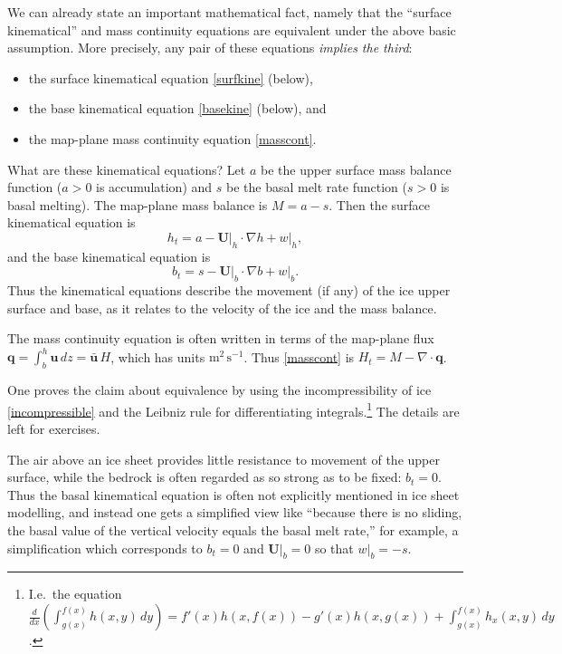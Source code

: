 \documentclass[titlepage,letterpaper,final,12pt]{scrartcl}
\newcommand{\bq}{\mathbf{q}}
\newcommand{\grad}{\nabla}
\newcommand{\Div}{\nabla\cdot}
\begin{document}
We can already state an important mathematical fact, namely that the ``surface kinematical'' and mass continuity equations are equivalent under the above basic assumption.  More precisely, any pair of these equations \emph{implies the third}:
  \begin{itemize}
  \item the surface kinematical equation \eqref{surfkine} (below),
  \item the base kinematical equation \eqref{basekine} (below), and
  \item the map-plane mass continuity equation \eqref{masscont}.
  \end{itemize}

What are these kinematical equations?  Let $a$ be the upper surface mass balance function ($a>0$ is accumulation) and $s$ be the basal melt rate function ($s>0$ is basal melting).  The map-plane mass balance is $M=a-s$.  Then the surface kinematical equation is 
\begin{equation}
h_t = a - \mathbf{U}\big|_h \cdot \grad h + w\big|_h,  \label{surfkine}
\end{equation}
and the base kinematical equation is
\begin{equation}
b_t = s - \mathbf{U}\big|_b \cdot \grad b + w\big|_b.  \label{basekine}
\end{equation}
Thus the kinematical equations describe the movement (if any) of the ice upper surface and base, as it relates to the velocity of the ice and the mass balance.

The mass continuity equation is often written in terms of the map-plane flux $\bq = \int_{b}^{h} \mathbf{u}\,dz = \bar{\mathbf{u}}\,H$, which has units $\text{m}^2\,\text{s}^{-1}$.  Thus \eqref{masscont} is $H_t = M - \Div \bq$.

One proves the claim about equivalence by using the incompressibility of ice \eqref{incompressible} and the Leibniz rule for differentiating integrals.\footnote{I.e.~the equation $\frac{d}{dx}\left(\int_{g(x)}^{f(x)} h(x,y)\,dy\right) = f'(x) h(x,f(x)) - g'(x) h(x,g(x)) + \int_{g(x)}^{f(x)} h_x(x,y)\,dy$.}  The details are left for exercises.

The air above an ice sheet provides little resistance to movement of the upper surface, while the bedrock is often regarded as so strong as to be fixed: $b_t=0$.  Thus the basal kinematical equation is often not explicitly mentioned in ice sheet modelling, and instead one gets a simplified view like ``because there is no sliding, the basal value of the vertical velocity equals the basal melt rate,'' for example, a simplification which corresponds to $b_t=0$ and $\mathbf{U}\big|_b=0$ so that $w\big|_b=-s$.
\end{document}
